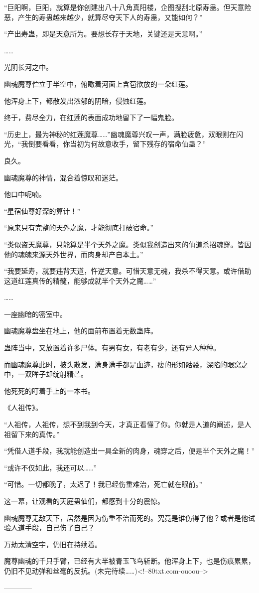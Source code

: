 \begin{this_body}
“巨阳啊，巨阳，就算是你创建出八十八角真阳楼，企图搜刮北原寿蛊。但天意险恶，产生的寿蛊越来越少，就算尽夺天下人的寿蛊，又能如何？”

“产出寿蛊，即是天意所为。要想长存于天地，关键还是天意啊。”

……

光阴长河之中。

幽魂魔尊伫立于半空中，俯瞰着河面上含苞欲放的一朵红莲。

他浑身上下，都散发出浓郁的阴暗，侵蚀红莲。

终于，费尽全力，在红莲的表面成功地留下了一幅鬼脸。

“历史上，最为神秘的红莲魔尊……”幽魂魔尊兴叹一声，满脸疲惫，双眼则在闪光，“我倒要看看，你当初为何故意收手，留下残存的宿命仙蛊？”

良久。

幽魂魔尊的神情，混合着惊叹和迷茫。

他口中呢喃。

“星宿仙尊好深的算计！”

“原来只有完整的天外之魔，才能彻底打破宿命。”

“类似盗天魔尊，只能算是半个天外之魔。类似我创造出来的仙道杀招魂穿。皆因他的魂魄来源天外世界，而肉身却产自本土。”

“我要延寿，就要违背天道，忤逆天意。可惜天意无魂，我杀不得天意。或许借助这道红莲真传的精髓，能够成就半个天外之魔……”

……

一座幽暗的密室中。

幽魂魔尊盘坐在地上，他的面前布置着无数蛊阵。

蛊阵当中，又放置着许多尸体。有男有女，有老有少，还有异人种种。

而幽魂魔尊此时，披头散发，满身满手都是血迹，瘦的形如骷髅，深陷的眼窝之中，一双眸子却绽射精芒。

他死死的盯着手上的一本书。

《人祖传》。

“人祖传，人祖传，想不到我到今天，才真正看懂了你。你就是人道的阐述，是人祖留下来的真传。”

“凭借人道手段，我就能创造出一具全新的肉身，魂穿之后，便是半个天外之魔！”

“或许不仅如此，我还可以……”

“可惜。一切都晚了，太迟了！我已经伤重难治，死亡就在眼前。”

这一幕，让观看的天庭蛊仙们，都感到十分的震惊。

幽魂魔尊无敌天下，居然是因为伤重不治而死的。究竟是谁伤得了他？或者是他试验人道手段，自己伤了自己？

万劫太清空宇，仍旧在持续着。

魔尊幽魂的千只手臂，已经有大半被青玉飞鸟斩断。他浑身上下，也是伤痕累累，仍旧不见动弹和丝毫的反抗。(未完待续……)<!--80txt.com-ouoou-->

------------

\end{this_body}

